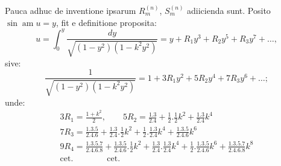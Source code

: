 \documentclass{article}
\begin{document}
Pauca adhuc de inventione ipsarum $R_{m}^{(n)}$, $S_{m}^{(n)}$ adiicienda sunt. Posito $\sin\operatorname{am}u=y$, fit e definitione proposita:
\[
u=\int_{0}^{y}\frac{dy}{\sqrt{(1-y^{2})(1-k^{2}y^{2})}}=y+R_{1}y^{3}+R_{2}y^{5}+R_{3}y^{7}+\ldots,
\]
sive:
\[
\frac{1}{\sqrt{(1-y^{2})(1-k^{2}y^{2})}}=1+3R_{1}y^{2}+5R_{2}y^{4}+7R_{3}y^{6}+\ldots;
\]
unde:
\[
\begin{gathered}
3R_{1}=\frac{1+k^{2}}{2},\qquad 5R_{2}=\frac{1.3}{2.4}+\frac{1}{2}.\frac{1}{2}k^{2}+\frac{1.3}{2.4}k^{4}\\[1.5ex]
7R_{3}=\frac{1.3.5}{2.4.6}+\frac{1.3}{2.4}.\frac{1}{2}k^{2}+\frac{1}{2}.\frac{1.3}{2.4}k^{4}+\frac{1.3.5}{2.4.6}k^{6}\\[1.5ex]
9R_{4}=\frac{1.3.5.7}{2.4.6.8}+\frac{1.3.5}{2.4.6}.\frac{1}{2}k^{2}+\frac{1.3}{2.4}.\frac{1.3}{2.4}k^{4}+\frac{1}{2}.\frac{1.3.5}{2.4.6}k^{6}+\frac{1.3.5.7}{2.4.6.8}k^{8}\\[1.5ex]
\text{cet.}\qquad\qquad\text{cet.}
\end{gathered}
\]
\end{document}
